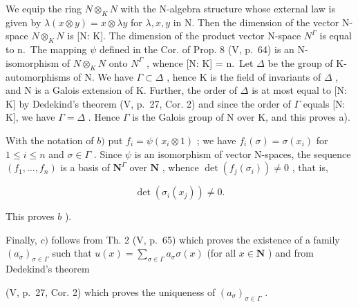 We equip the ring \(N \otimes_{K} N\) with the N-algebra structure whose external law is given by \(\lambda(x \otimes y) = x \otimes \lambda y\) for \(\lambda, x, y\) in N. Then the dimension of the vector N-space \(N \otimes_{K} N\) is {[}N: K{]}. The dimension of the product vector N-space \(N^{\Gamma}\) is equal to n.~The mapping \(\psi\) defined in the Cor. of Prop. 8 (V, p.~64) is an N-isomorphism of \(N \otimes_{K} N\) onto \(N^{\Gamma}\) , whence {[}N: K{]} = n.~Let \(\Delta\) be the group of K-automorphisms of N. We have \(\Gamma \subset \Delta\) , hence K is the field of invariants of \(\Delta\) , and N is a Galois extension of K. Further, the order of \(\Delta\) is at most equal to {[}N: K{]} by Dedekind's theorem (V, p.~27, Cor. 2) and since the order of \(\Gamma\) equals {[}N: K{]}, we have \(\Gamma = \Delta\) . Hence \(\Gamma\) is the Galois group of N over K, and this proves a).

With the notation of \(b)\) put \(f_{i} = \psi(x_{i} \otimes 1)\) ; we have \(f_{i}(\sigma) = \sigma(x_{i})\) for \(1 \leqslant i \leqslant n\) and \(\sigma \in \Gamma\) . Since \(\psi\) is an isomorphism of vector N-spaces, the sequence \((f_{1}, \ldots, f_{n})\) is a basis of \(\mathbf{N}^{\Gamma}\) over \(\mathbf{N}\) , whence \(\det(f_{j}(\sigma_{i})) \neq 0\) , that is,

\[
\det \left(\sigma_ {i} (x _ {j})\right) \neq 0.
\]

This proves \(b\) ).

Finally, \(c)\) follows from Th. 2 (V, p.~65) which proves the existence of a family \((a_{\sigma})_{\sigma \in \Gamma}\) such that \(u(x) = \sum_{\sigma \in \Gamma} a_{\sigma} \sigma(x)\) (for all \(x \in \mathbf{N}\) ) and from Dedekind's theorem

(V, p.~27, Cor. 2) which proves the uniqueness of \((a_{\sigma})_{\sigma \in \Gamma}\) .

